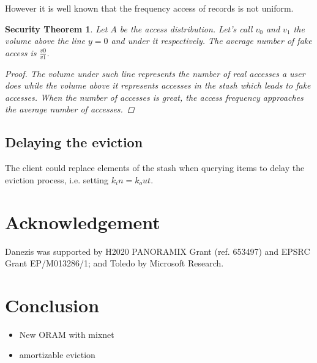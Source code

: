 \documentclass[english,oneside,twocolumn]{article}
\newtheorem{secthm}{Security Theorem}
\begin{document}
However it is well known that the frequency access of records is not uniform.
\begin{secthm}
Let $A$ be the access distribution. Let's call $v_0$ and $v_1$ the volume above the line $y=0$ and under it respectively.
The average number of fake access is $ \frac{v0}{v1}$.
\begin{proof}
 The volume under such line represents the number of real accesses a user does while the volume above it represents accesses in the stash which leads to fake accesses.
 When the number of accesses is great, the access frequency approaches the average number of accesses.
\end{proof}
\end{secthm}

\subsection{Delaying the eviction}

The client could replace elements of the stash when querying items to delay the eviction process, i.e. setting $k_in=k_out$.


\section{Acknowledgement}
Danezis was supported by H2020  PANORAMIX Grant (ref. 653497) and EPSRC Grant EP/M013286/1; and Toledo by Microsoft Research.


\section{Conclusion}
\begin{itemize}
 \item New ORAM with mixnet
 \item amortizable eviction
\end{itemize}


{}

\end{document}
